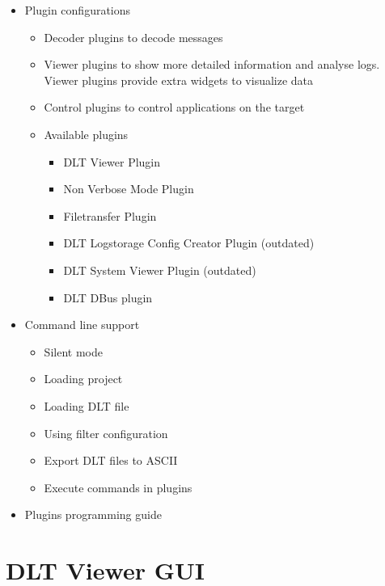 \documentclass[a4paper,11pt]{article}
\begin{document}
\begin{itemize}
\begin{itemize}
    \item Select displayed columns
    \item Default project loading
    \item Automatic timezone synchronisation (v2.10.1)
   \end{itemize}
\item Plugin configurations
   \begin{itemize}
    \item Decoder plugins to decode messages
    \item Viewer plugins to show more detailed information and analyse logs. Viewer plugins provide extra widgets to visualize data
    \item Control plugins to control applications on the target
    \item Available plugins
     \begin{itemize}
        \item DLT Viewer Plugin
        \item Non Verbose Mode Plugin
        \item Filetransfer Plugin
        \item DLT Logstorage Config Creator Plugin (outdated)
        \item DLT System Viewer Plugin (outdated)
        \item DLT DBus plugin
     \end{itemize}
   \end{itemize}
\item Command line support
 \begin{itemize}
    \item Silent mode
    \item Loading project
    \item Loading DLT file
    \item Using filter configuration
    \item Export DLT files to ASCII
    \item Execute commands in plugins
 \end{itemize}
\item Plugins programming guide
\end{itemize}

\pagebreak

\section{DLT Viewer GUI}
\end{document}
